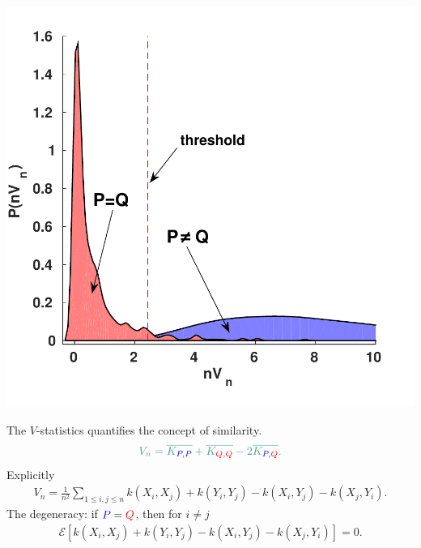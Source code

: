 \documentclass[landscape,a0]{a0poster_csml_v2}
\newcommand{\ev}{\mathcal{E}}
\begin{document}
\begin{poster}
\begin{PosterColumn}


\begin{minipage}[c]{0.4\textwidth}
\includegraphics[width=\textwidth]{../img/altAndNull.pdf}
\end{minipage}
\begin{minipage}[c]{0.59\textwidth}
The $V$-statistics quantifies the concept of similarity.  
\begin{align*}
 \color{mpigreen} V_n = \overline{ K_{\color{blue}P,P}} + \overline{ K_{\color{red}Q,Q} } - 2 \overline{  K_{{\color{blue}P,\color{red}Q}} }.
\end{align*}
Explicitly 
\begin{align*}
 V_n = \frac{1}{n^2} \sum_{1 \leq i,j \leq n} k(X_i,X_j) + k(Y_i,Y_j) - k(X_i,Y_j) - k(X_j,Y_i).
\end{align*}
The degeneracy: if $ {\color{blue} P}= \color{red} Q$, then for $i \neq j$ 
\begin{align*}
 \ev \left[ k(X_i,X_j) + k(Y_i,Y_j) - k(X_i,Y_j) - k(X_j,Y_i) \right]=0 .
\end{align*}
\end{minipage}\\





\end{PosterColumn}
\end{poster}
\end{document}
